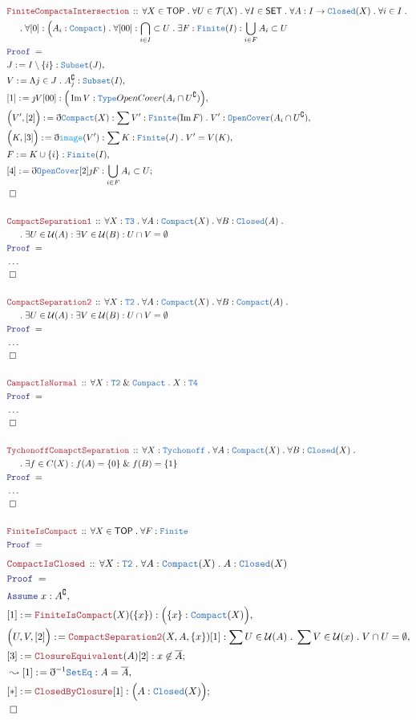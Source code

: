 \documentclass[12pt]{scrartcl}
\newcommand{\TYPE}[1]{\textcolor{NavyBlue}{\mathtt{#1}}}
\newcommand{\FUNC}[1]{\textcolor{Cerulean}{\mathtt{#1}}}
\newcommand{\LOGIC}[1]{\textcolor{Blue}{\mathtt{#1}}}
\newcommand{\THM}[1]{\textcolor{Maroon}{\mathtt{#1}}}
\renewcommand{\.}{\; . \;}
\newcommand{\de}{: \kern 0.1pc =}
\newcommand{\Theorem}[2]{& \THM{#1} \, :: \, #2 \\ & \Proof = \\ }
\newcommand{\NewLine}{\\ & \kern 1pc}
\newcommand{\Page}[1]{ \begin{align*} #1 \end{align*}   }
\newcommand{ \bd }{ \ByDef }
\newcommand{\NoProof}{ & \ldots \\ \EndProof}
\renewcommand{\And}{\; \& \;}
\newcommand{\Type}{\TYPE{Type}}
\DeclareMathOperator*{\im}{Im}
\renewcommand{\c}{\complement}
\newcommand{\Say}[3]{& #1 \de #2 : #3, \\}
\newcommand{\Conclude}[3]{& #1 \de #2 : #3; \\}
\newcommand{\Derive}[3]{& \leadsto #1 \de #2 : #3, \\}
\newcommand{\Assume}[2]{& \LOGIC{Assume} \; #1 : #2, \\}
\newcommand{\QED}{\; \square}
\newcommand{\EndProof}{& \QED \\}
\newcommand{\ByDef}{\eth}
\newcommand{\ByConstr}{\jmath}
\newcommand{\Proof}{\LOGIC{Proof} \; }
\newcommand{\SET}{\mathsf{SET}}
\newcommand{\TOP}{\mathsf{TOP}}
\newcommand{\T}{\mathcal{T}}
\renewcommand{\U}{\mathcal{U}}
\begin{document}
\Page{
	\Theorem{FiniteCompactaIntersection}
	{
		\forall X \in \TOP \.
		\forall U \in \T(X) \.
		\forall I \in \SET \.
		\forall A : I \to \TYPE{Closed}(X) \.
		\forall i \in I \. \NewLine \. 
		\forall [0] : \Big(A_i : \TYPE{Compact}) \.
		\forall [00] : \bigcap_{i \in I} \subset U \.
		\exists F : \TYPE{Finite}(I) :
		\bigcup_{i \in F} A_i \subset U
	}
	\Say{J}{I \setminus \{i\}}{\TYPE{Subset}(J)}
	\Say{V}{\Lambda j \in J \.  A_j^\c }{\TYPE{Subset}(I)} 
	\Say{[1]}{\ByConstr V [00]}{ \Big( \im V : \Type{OpenCover}(A_i \cap U^\c)  \Big)}
	\Say{\Big( V', [2]\Big)}{ \bd \TYPE{Compact}(X)  }
	{
		\sum V' : \TYPE{Finite}(\im F) \. V' : \TYPE{OpenCover}(A_i \cap U^\c) 
	}
	\Say{\Big(K,[3]\Big)}{ \bd \FUNC{image}(V')}{ \sum  K : \TYPE{Finite}(J) \. V' = V(K)}
	\Say{F}{K \cup \{i\}}{\TYPE{Finite}(I)}
	\Conclude{[4]}{\bd \TYPE{OpenCover}[2]\ByConstr F}{ \bigcup_{i \in F} A_i \subset U }
	\EndProof
	\\
	\Theorem{CompactSeparation1}
	{
		\forall X : \TYPE{T3} \.
		\forall A : \TYPE{Compact}(X) \.
		\forall B : \TYPE{Closed}(A) \. \NewLine \. 
		\exists U \in \U(A) :
		\exists V \in \U(B) :
		U \cap V = \emptyset
	}
	\NoProof
	\\
	\Theorem{CompactSeparation2}
	{
		\forall X : \TYPE{T2} \.
		\forall A : \TYPE{Compact}(X) \.
		\forall B : \TYPE{Compact}(A) \. \NewLine \. 
		\exists U \in \U(A) :
		\exists V \in \U(B) :
		U \cap V = \emptyset
	}
	\NoProof
	\\
	\Theorem{CampactIsNormal}
	{
		\forall X : \TYPE{T2} \And \TYPE{Compact} \.
		X : \TYPE{T4}
	}
	\NoProof
	\\
	\Theorem{TychonoffComapctSeparation}
	{
		\forall X : \TYPE{Tychonoff} \. 
		\forall A : \TYPE{Compact}(X) \.
		\forall B : \TYPE{Closed}(X) \. \NewLine \. 
		\exists f  \in C(X) :
		f(A) = \{0\} \And f(B) = \{1\}
	}
	\NoProof
	\\
	\Theorem{FiniteIsCompact}
	{
		\forall X \in \TOP \.
		\forall F : \TYPE{Finite}
	}
}\Page{
	\Theorem{CompactIsClosed}
	{
		\forall X : \TYPE{T2} \.
		\forall A : \TYPE{Compact}(X) \.
		A : \TYPE{Closed}(X)
	}
	\Assume{x}{A^\c}
	\Say{[1]}{\THM{FiniteIsCompact}(X)(\{x\})}{\Big( \{x\} : \TYPE{Compact}(X) \Big)}
	\Say{\Big( U, V, [2] \Big)}{ \THM{CompactSeparation2}(X,A,\{x\})[1]}
	{
		\sum U \in \U(A) \. \sum V \in \U(x) \. V \cap U = \emptyset
	}
	\Conclude{[3]}{\THM{ClosureEquivalent}(A)[2]}
	{
		x \not \in \overline{A}
	}
	\Derive{[1]}{\bd^{-1} \TYPE{SetEq}}{A = \overline{A}}
	\Conclude{[*]}{\THM{ClosedByClosure}[1]}{\Big( A : \TYPE{Closed}(X)\Big)}
	\EndProof
	\\
}
\end{document}
